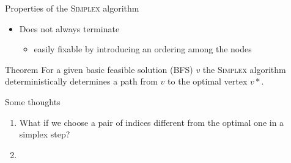 \documentclass[10pt]{beamer}
\begin{document}
\begin{frame}{Properties of the \textsc{Simplex} algorithm}
	
	\begin{itemize}
		\item Does not always terminate
		\begin{itemize}
			\item easily fixable by introducing an ordering among the nodes
		\end{itemize}
	\end{itemize}
	\pause 
	\begin{alertblock}{Theorem}
		For a given basic feasible solution (BFS) $v$ the \textsc{Simplex} algorithm deterministically determines a path from $v$ to the optimal vertex $v*$.
	\end{alertblock}
\end{frame}

\begin{frame}{Some thoughts}
	\begin{enumerate}
		\item What if we choose a pair of indices different from the optimal one in a simplex step?
		\item  
	\end{enumerate}
\end{frame}
\end{document}

